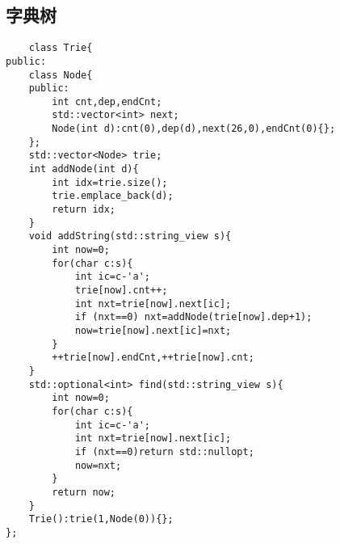 \documentclass[UTF8]{ctexart}
\begin{document}
\subsection{字典树}
\begin{lstlisting}
    class Trie{
public:
    class Node{
    public:
        int cnt,dep,endCnt;
        std::vector<int> next;
        Node(int d):cnt(0),dep(d),next(26,0),endCnt(0){};
    };
    std::vector<Node> trie;
    int addNode(int d){
        int idx=trie.size();
        trie.emplace_back(d);
        return idx;
    }
    void addString(std::string_view s){
        int now=0;
        for(char c:s){
            int ic=c-'a';
            trie[now].cnt++;
            int nxt=trie[now].next[ic];
            if (nxt==0) nxt=addNode(trie[now].dep+1);
            now=trie[now].next[ic]=nxt;
        }
        ++trie[now].endCnt,++trie[now].cnt;
    }
    std::optional<int> find(std::string_view s){
        int now=0;
        for(char c:s){
            int ic=c-'a';
            int nxt=trie[now].next[ic];
            if (nxt==0)return std::nullopt;
            now=nxt;
        }
        return now;
    }
    Trie():trie(1,Node(0)){};
};
\end{lstlisting}
\end{document}
